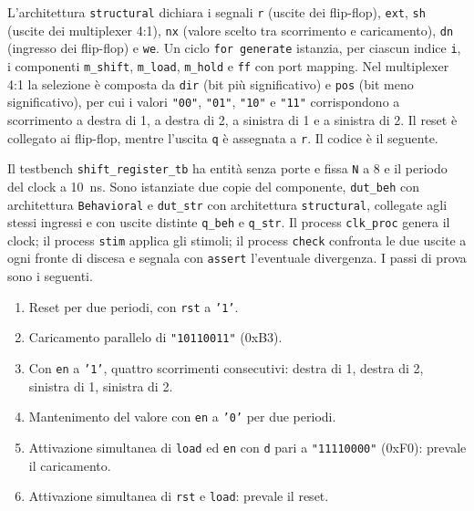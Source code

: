 L'architettura \texttt{structural} dichiara i segnali \texttt{r} (uscite dei flip-flop), \texttt{ext}, \texttt{sh} (uscite dei multiplexer 4:1), \texttt{nx} (valore scelto tra scorrimento e caricamento), \texttt{dn} (ingresso dei flip-flop) e \texttt{we}. Un ciclo \texttt{for generate} istanzia, per ciascun indice \texttt{i}, i componenti \texttt{m\_shift}, \texttt{m\_load}, \texttt{m\_hold} e \texttt{ff} con port mapping. Nel multiplexer 4:1 la selezione è composta da \texttt{dir} (bit più significativo) e \texttt{pos} (bit meno significativo), per cui i valori \texttt{"00"}, \texttt{"01"}, \texttt{"10"} e \texttt{"11"} corrispondono a scorrimento a destra di 1, a destra di 2, a sinistra di 1 e a sinistra di 2. Il reset è collegato ai flip-flop, mentre l'uscita \texttt{q} è assegnata a \texttt{r}. Il codice è il seguente.


\simulazione

Il testbench \texttt{shift\_register\_tb} ha entità senza porte e fissa \texttt{N} a 8 e il periodo del clock a \SI{10}{ns}. Sono istanziate due copie del componente, \texttt{dut\_beh} con architettura \texttt{Behavioral} e \texttt{dut\_str} con architettura \texttt{structural}, collegate agli stessi ingressi e con uscite distinte \texttt{q\_beh} e \texttt{q\_str}. Il process \texttt{clk\_proc} genera il clock; il process \texttt{stim} applica gli stimoli; il process \texttt{check} confronta le due uscite a ogni fronte di discesa e segnala con \texttt{assert} l'eventuale divergenza. I passi di prova sono i seguenti.

\begin{enumerate}
  \item Reset per due periodi, con \texttt{rst} a \texttt{'1'}.
  \item Caricamento parallelo di \texttt{"10110011"} (0xB3).
  \item Con \texttt{en} a \texttt{'1'}, quattro scorrimenti consecutivi: destra di 1, destra di 2, sinistra di 1, sinistra di 2.
  \item Mantenimento del valore con \texttt{en} a \texttt{'0'} per due periodi.
  \item Attivazione simultanea di \texttt{load} ed \texttt{en} con \texttt{d} pari a \texttt{"11110000"} (0xF0): prevale il caricamento.
  \item Attivazione simultanea di \texttt{rst} e \texttt{load}: prevale il reset.
\end{enumerate}

